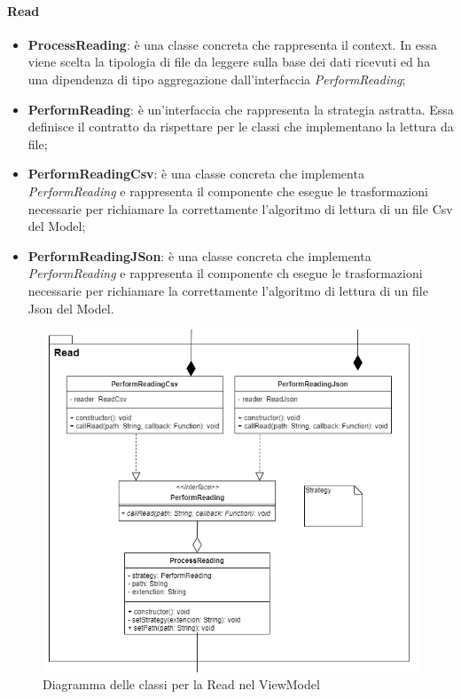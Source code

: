 		\paragraph*{Read} \mbox{}
		\begin{itemize}
			\item \textbf{ProcessReading}: è una classe concreta che rappresenta il context. In essa viene scelta la tipologia di file da leggere sulla base dei dati ricevuti ed ha una dipendenza di tipo aggregazione dall'interfaccia \textit{PerformReading};
			\item \textbf{PerformReading}: è un'interfaccia che rappresenta la strategia astratta. Essa definisce il contratto da rispettare per le classi che implementano la lettura da file;
			\item \textbf{PerformReadingCsv}: è una classe concreta che implementa \textit{PerformReading} e rappresenta il componente che esegue le trasformazioni necessarie per richiamare la correttamente l'algoritmo di lettura di un file Csv del Model;
			\item \textbf{PerformReadingJSon}: è una classe concreta che implementa \textit{PerformReading} e rappresenta il componente ch esegue le trasformazioni necessarie per richiamare la correttamente l'algoritmo di lettura di un file Json del Model.
		\end{itemize}
		\mbox{}
				\begin{figure} [H]
					\includegraphics[width=\linewidth]{img/Diagrammi/ViewModel-read-app.png}
					\caption{Diagramma delle classi per la Read nel ViewModel}
				\end{figure}
